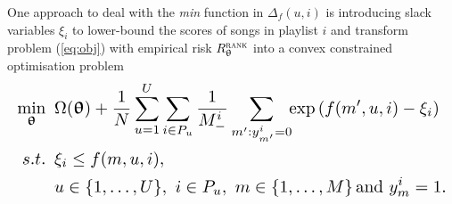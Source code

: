 %
%
%
%

One approach to deal with the \emph{min} function in $\Delta_f(u, i)$ is introducing 
slack variables $\xi_i$ to lower-bound the scores of songs in playlist $i$ %
and 
transform problem (\ref{eq:obj}) with empirical risk $R_{\uptheta}^{\textsc{rank}}$ into a convex constrained optimisation problem %
\begin{equation*}
\resizebox{\columnwidth}{!}{$\displaystyle
\begin{aligned}
\min_{\upthetabm} \ \, & 
\Omega(\upthetabm) 
+ \frac{1}{N} \sum_{u=1}^U \sum_{i \in P_u} \frac{1}{M_-^i} \sum_{m': y_{m'}^i = 0} \!\! \exp \left( f(m', u, i) - \xi_i \right) \\
s.t. \ \, & 
\xi_i \le f(m, u, i), \\
& u \in \{1,\dots,U\}, \ i \in P_u, \ m \in \{1,\dots,M\} \, \text{and} \ y_m^i = 1.
\end{aligned}
$}
\end{equation*}

